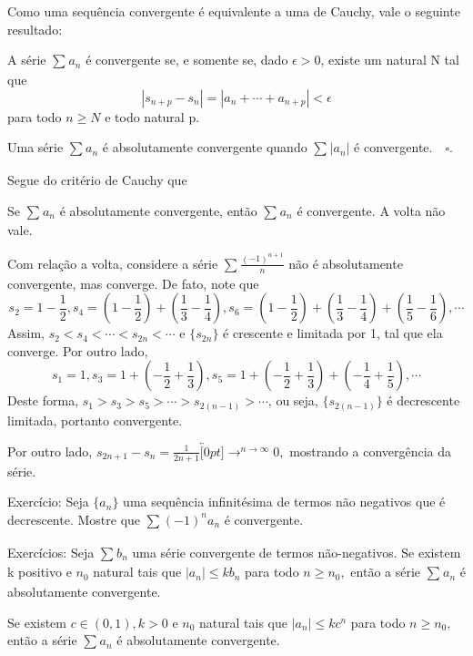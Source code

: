 \documentclass[Analysis/analysis_notes.tex]{subfiles}
\begin{document}
Como uma sequ\^encia convergente \'e equivalente a uma de Cauchy, vale o seguinte resultado:
\begin{theorem*}
  A s\'erie $\sum\limits_{}^{}a_{n}$ \'e convergente se, e somente se, dado $\epsilon > 0$, existe um natural N tal que 
    $$
      |s_{n+p} - s_{n}| = |a_{n} + \cdots + a_{n+p}| < \epsilon
    $$
    para todo $n\geq{N}$ e todo natural p.
\end{theorem*}
 \begin{def*}
   Uma s\'erie $\sum\limits_{}^{}a_{n}$ \'e absolutamente convergente quando $\sum\limits_{}^{}|a_{n}|$ \'e convergente.$\quad\square.$
 \end{def*}
 Segue do crit\'erio de Cauchy que 
\begin{theorem*}
  Se $\sum\limits_{}^{}a_{n}$ \'e absolutamente convergente, ent\~ao $\sum\limits_{}^{}a_{n}$ \'e convergente. A volta n\~ao vale.
\end{theorem*}
  Com rela\c c\~ao a volta, considere a s\'erie $\sum\limits_{}^{}\frac{(-1)^{n+1}}{n}$ n\~ao \'e absolutamente convergente, mas converge. 
  De fato, note que 
    $$
      s_{2} = 1 - \frac{1}{2}, s_{4} = (1-\frac{1}{2}) + (\frac{1}{3}-\frac{1}{4}), s_{6} = (1-\frac{1}{2}) + (\frac{1}{3}-\frac{1}{4}) + (\frac{1}{5}-\frac{1}{6}), \cdots
    $$
    Assim, $s_{2}<s_{4}<\cdots<s_{2n}<\cdots$ e $\{s_{2n}\}$ \'e crescente e limitada por 1, tal que ela converge. Por outro lado, 
      $$
        s_{1} = 1, s_{3} = 1 + (-\frac{1}{2} + \frac{1}{3}), s_{5} = 1 + (-\frac{1}{2}+\frac{1}{3}) + (-\frac{1}{4}+\frac{1}{5}), \cdots
      $$ 
      Deste forma, $s_{1} > s_{3} > s_{5} > \cdots > s_{2(n-1)} > \cdots$, ou seja, $\{s_{2(n-1)}\}$ \'e decrescente limitada, portanto convergente.

      Por outro lado, $s_{2n+1}-s_{n} = \frac{1}{2n+1}\overbracket[0pt]{\longrightarrow}^{n\to \infty}0,$ mostrando a converg\^encia da s\'erie.
 \begin{example}
   Exerc\'icio: Seja $\{a_{n}\}$ uma sequ\^encia infinit\'esima de termos n\~ao negativos que \'e decrescente. Mostre que $\sum\limits_{}^{}(-1)^{n}a_{n}$
  \'e convergente.
 \end{example}
\begin{example}
  Exerc\'icios: Seja $\sum\limits_{}^{}b_{n}$ uma s\'erie convergente de termos n\~ao-negativos. Se existem k positivo e $n_{0}$
natural tais que $|a_{n}|\leq{kb_{n}}$ para todo $n\geq{n_{0}},$ ent\~ao a s\'erie $\sum\limits_{}^{}a_{n}$ \'e absolutamente convergente.

  Se existem $c\in(0, 1), k > 0$ e $n_{0}$ natural tais que $|a_{n}|\leq{kc^{n}}$ para todo $n\geq{n_{0}},$ ent\~ao a s\'erie 
 $\sum\limits_{}^{}a_{n}$ \'e absolutamente convergente.
\end{example}
\end{document}
